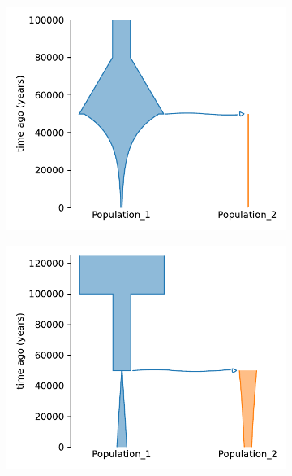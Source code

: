 \begin{figure}[ht]
    \centering
    \begin{subfigure}[c]{.32\textwidth}
    \includegraphics[width=\textwidth]{images_2/picture_2pops_str_2.pdf}
    \caption{}
    \label{fig:auto:struct_2_1_0_ex_1}
    \end{subfigure}%
    \begin{subfigure}[c]{.32\textwidth}
    \includegraphics[width=\textwidth]{images_2/picture_2pops_str_3.pdf}
    \caption{}
    \label{fig:auto:struct_2_1_0_ex_2}
    \end{subfigure}%
    \begin{subfigure}[c]{.32\textwidth}

\end{subfigure}
\end{figure}
